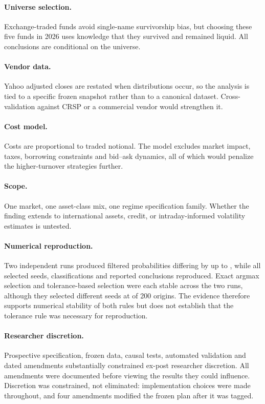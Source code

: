 \paragraph{Universe selection.} Exchange-traded funds avoid single-name
survivorship bias, but choosing these five funds in 2026 uses knowledge
that they survived and remained liquid. All conclusions are conditional
on the universe.

\paragraph{Vendor data.} Yahoo adjusted closes are restated when
distributions occur, so the analysis is tied to a specific frozen
snapshot rather than to a canonical dataset. Cross-validation against
CRSP or a commercial vendor would strengthen it.

\paragraph{Cost model.} Costs are proportional to traded notional. The
model excludes market impact, taxes, borrowing constraints and bid--ask
dynamics, all of which would penalize the higher-turnover strategies
further.

\paragraph{Scope.} One market, one asset-class mix, one regime
specification family. Whether the finding extends to international
assets, credit, or intraday-informed volatility estimates is untested.

\paragraph{Numerical reproduction.} Two independent runs produced
filtered probabilities differing by up to \reproductionMaxDifference{},
while all selected seeds, classifications and reported conclusions
reproduced. Exact argmax selection and tolerance-based selection were
each stable across the two runs, although they selected different seeds
at \argmaxToleranceDisagreements{} of
200 origins. The evidence therefore supports numerical stability of both
rules but does not establish that the tolerance rule was necessary for
reproduction.

\paragraph{Researcher discretion.} Prospective specification, frozen data, causal
tests, automated validation and dated amendments substantially
constrained ex-post researcher discretion. All amendments were
documented before viewing the results they could influence. Discretion
was constrained, not eliminated: implementation choices were made
throughout, and four amendments modified the frozen plan after it was
tagged.
